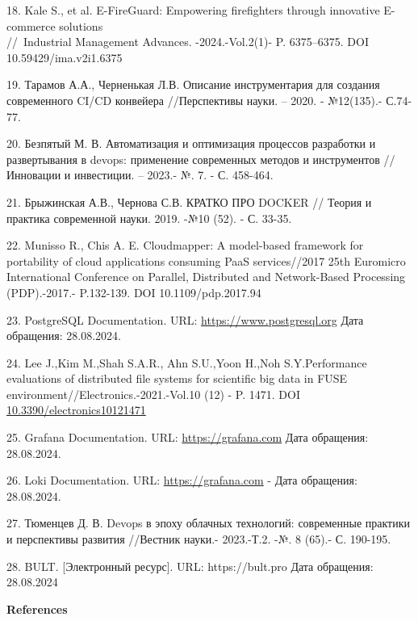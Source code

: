 \begin{references}
18. Kale S., et al. E-FireGuard: Empowering firefighters through
innovative E-commerce solutions \\//~Industrial Management
Advances. -2024.-Vol.2(1)- P. 6375--6375.
DOI 10.59429/ima.v2i1.6375

19. Тарамов А.А., Черненькая Л.В. Описание инструментария для создания
современного CI/CD конвейера //Перспективы науки. -- 2020. - №12(135).-
С.74-77.

20. Безпятый М. В. Автоматизация и оптимизация процессов разработки и
развертывания в devops: применение современных методов и инструментов
//Инновации и инвестиции. -- 2023.- №. 7. - С. 458-464.

21. Брыжинская А.В., Чернова С.В. КРАТКО ПРО DOCKER // Теория и практика
современной науки. 2019. -№10 (52). - С. 33-35.

22. Munisso R., Chis A. E. Cloudmapper: A model-based framework for
portability of cloud applications consuming PaaS services//2017 25th
Euromicro International Conference on Parallel, Distributed and
Network-Based Processing (PDP).-2017.- P.132-139. DOI
10.1109/pdp.2017.94

23. PostgreSQL Documentation. URL:
\href{https://www.postgresql.org/docs/-}{https://www.postgresql.org} Дата обращения: 28.08.2024.

24. Lee J.,Kim M.,Shah S.A.R., Ahn S.U.,Yoon H.,Noh S.Y.Performance
evaluations of distributed file systems for scientific big data in FUSE
environment//Electronics.-2021.-Vol.10 (12) - P. 1471. DOI \\
\href{https://doi.org/10.3390/electronics10121471}{10.3390/electronics10121471}

25. Grafana Documentation. URL: \href{https://grafana.com/docs/-}{https://grafana.com} Дата
обращения: 28.08.2024.

26. Loki Documentation. URL: \href{https://grafana.com/oss/loki/}{https://grafana.com} - Дата
обращения: \\28.08.2024.

27. Тюменцев Д. В. Devops в эпоху облачных технологий: современные
практики и перспективы развития //Вестник науки.- 2023.-Т.2. -№. 8
(65).- С. 190-195.

28. BULT. {[}Электронный ресурс{]}. URL: https://bult.pro Дата
обращения: 28.08.2024
\end{references}

\begin{center}
{\bfseries References}
\end{center}

